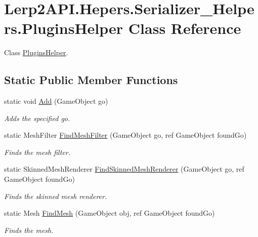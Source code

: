 \hypertarget{class_lerp2_a_p_i_1_1_hepers_1_1_serializer___helpers_1_1_plugins_helper}{}\section{Lerp2\+A\+P\+I.\+Hepers.\+Serializer\+\_\+\+Helpers.\+Plugins\+Helper Class Reference}
\label{class_lerp2_a_p_i_1_1_hepers_1_1_serializer___helpers_1_1_plugins_helper}


Class \hyperlink{class_lerp2_a_p_i_1_1_hepers_1_1_serializer___helpers_1_1_plugins_helper}{Plugins\+Helper}.  


\subsection*{Static Public Member Functions}
\begin{DoxyCompactItemize}
\item 
static void \hyperlink{class_lerp2_a_p_i_1_1_hepers_1_1_serializer___helpers_1_1_plugins_helper_a2f7b9cf35c5fe0594e895fe68125e361}{Add} (Game\+Object go)
\begin{DoxyCompactList}\small\item\em Adds the specified go. \end{DoxyCompactList}\item 
static Mesh\+Filter \hyperlink{class_lerp2_a_p_i_1_1_hepers_1_1_serializer___helpers_1_1_plugins_helper_aaaefd6ca4f5d8601aa034b5922227b4b}{Find\+Mesh\+Filter} (Game\+Object go, ref Game\+Object found\+Go)
\begin{DoxyCompactList}\small\item\em Finds the mesh filter. \end{DoxyCompactList}\item 
static Skinned\+Mesh\+Renderer \hyperlink{class_lerp2_a_p_i_1_1_hepers_1_1_serializer___helpers_1_1_plugins_helper_a1493c1b7f3150288cecb794c46f63e0a}{Find\+Skinned\+Mesh\+Renderer} (Game\+Object go, ref Game\+Object found\+Go)
\begin{DoxyCompactList}\small\item\em Finds the skinned mesh renderer. \end{DoxyCompactList}\item 
static Mesh \hyperlink{class_lerp2_a_p_i_1_1_hepers_1_1_serializer___helpers_1_1_plugins_helper_a5b1133bdcd955678deb647e7a6531056}{Find\+Mesh} (Game\+Object obj, ref Game\+Object found\+Go)
\begin{DoxyCompactList}\small\item\em Finds the mesh. \end{DoxyCompactList}\end{DoxyCompactItemize}
